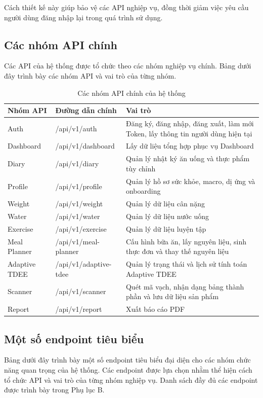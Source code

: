 \documentclass[12pt, a4paper]{report}
\begin{document}
Cách thiết kế này giúp bảo vệ các API nghiệp vụ, đồng thời giảm việc yêu cầu người dùng đăng nhập lại trong quá trình sử dụng.


\subsection{Các nhóm API chính}Các API của hệ thống được tổ chức theo các nhóm nghiệp vụ chính. Bảng dưới đây trình bày các nhóm API và vai trò của từng nhóm.

\begin{table}[htbp]
\centering
\caption{Các nhóm API chính của hệ thống}
\begin{tabular}{|p{4cm}|p{4cm}|p{7cm}|}
\hline
\textbf{Nhóm API} & \textbf{Đường dẫn chính} & \textbf{Vai trò} \\
\hline
Auth & /api/v1/auth & Đăng ký, đăng nhập, đăng xuất, làm mới Token, lấy thông tin người dùng hiện tại \\
\hline
Dashboard & /api/v1/dashboard & Lấy dữ liệu tổng hợp phục vụ Dashboard \\
\hline
Diary & /api/v1/diary & Quản lý nhật ký ăn uống và thực phẩm tùy chỉnh \\
\hline
Profile & /api/v1/profile & Quản lý hồ sơ sức khỏe, macro, dị ứng và onboarding \\
\hline
Weight & /api/v1/weight & Quản lý dữ liệu cân nặng \\
\hline
Water & /api/v1/water & Quản lý dữ liệu nước uống \\
\hline
Exercise & /api/v1/exercise & Quản lý dữ liệu luyện tập \\
\hline
Meal Planner & /api/v1/meal-planner & Cấu hình bữa ăn, lấy nguyên liệu, sinh thực đơn và thay thế nguyên liệu \\
\hline
Adaptive TDEE & /api/v1/adaptive-tdee & Quản lý trạng thái và lịch sử tính toán Adaptive TDEE \\
\hline
Scanner & /api/v1/scanner & Quét mã vạch, nhận dạng bảng thành phần và lưu dữ liệu sản phẩm \\
\hline
Report & /api/v1/report & Xuất báo cáo PDF \\
\hline
\end{tabular}
\end{table}
\subsection{Một số endpoint tiêu biểu}Bảng dưới đây trình bày một số endpoint tiêu biểu đại diện cho các nhóm chức năng quan trọng của hệ thống. Các endpoint được lựa chọn nhằm thể hiện cách tổ chức API và vai trò của từng nhóm nghiệp vụ. Danh sách đầy đủ các endpoint được trình bày trong Phụ lục B.
\end{document}
